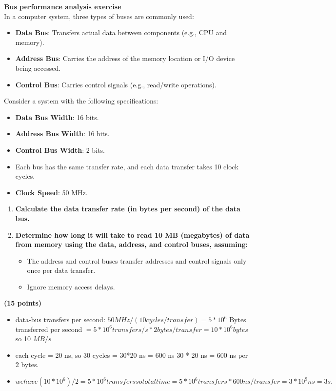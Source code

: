 \documentclass[10pt,answers]{exam}
\newcommand{\qpoints}[1]{\hfill \textbf{(#1 points)}}
\begin{document}
\begin{questions}
\question \textbf{Bus performance analysis exercise} \\ 
In a computer system, three types of buses are commonly used: 

\begin{itemize}
    \item \textbf{Data Bus}: Transfers actual data between components (e.g., CPU and memory).
    \item \textbf{Address Bus}: Carries the address of the memory location or I/O device being accessed.
    \item \textbf{Control Bus}: Carries control signals (e.g., read/write operations).
\end{itemize}

Consider a system with the following specifications:

\begin{itemize}
    \item \textbf{Data Bus Width}: 16 bits.
    \item \textbf{Address Bus Width}: 16 bits.
    \item \textbf{Control Bus Width}: 2 bits.
    \item Each bus has the same transfer rate, and each data transfer takes 10 clock cycles.
    \item \textbf{Clock Speed}: 50 MHz.
\end{itemize}

\begin{enumerate}[label=\arabic*.]
    \item \textbf{Calculate the data transfer rate (in bytes per second) of the data bus.}

    \item \textbf{Determine how long it will take to read 10 MB (megabytes) of data from memory using the data, address, and control buses, assuming:}
    \begin{itemize}
        \item The address and control buses transfer addresses and control signals only once per data transfer.
        \item Ignore memory access delays.
    \end{itemize}
\end{enumerate} \qpoints{15}

\begin{solution}
    \begin{itemize}
        \item data-bus transfers per second: $50 MHz /(10 cycles/transfer) = 5*10^6$
        Bytes transferred per second $= 5 * 10^6 transfers/s * 2 bytes/transfer = 10 * 10^6 bytes$ so 10 $MB/s$
		\item each cycle = 20 ns, so 30 cycles = 30*20 ns = 600 ns 30 * 20 ns = 600 ns per 2 bytes.
		\item $we have (10*10^6)/2 = 5 * 10 ^6 transfers so total time = 5 * 10^6 transfers * 600 ns/transfer = 3*10^9ns = 3s.$
    \end{itemize}
\end{solution}


\end{questions}
\end{document}
